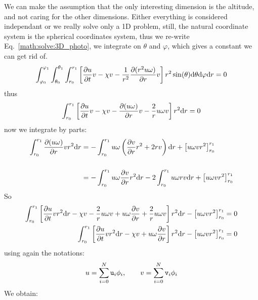 We can make the assumption that the only interesting dimension is the altitude, and
not caring for the other dimensions. Either everything
is considered independant or we really solve only a 1D problem, still,
the natural coordinate system is the spherical
coordinates system, thus we re-write Eq.~\ref{math:solve:3D_photo}, 
we integrate on $\theta$ and $\varphi$,
which gives a constant we can get rid of.
\begin{equation}
\int_{\varphi_0}^{\varphi_1}\int_{\theta_0}^{\theta_1}\int_{r_0}^{r_1}\left[   \frac{\partial u}{\partial t} v 
                       - \chi v - \frac{1}{r^2}\frac{\partial(r^2u\omega)}{\partial r} v
                \right] r^2\sin(\theta)\mathrm{d}\theta\mathrm{d}\varphi\mathrm{d} r = 0
\end{equation}
thus
\begin{equation}
\int_{r_0}^{r_1}\left[   \frac{\partial u}{\partial t} v 
                       - \chi v - \frac{\partial(u\omega)}{\partial r} v
                       - \frac{2}{r}u\omega v
                \right] r^2\mathrm{d} r = 0
\end{equation}
now we integrate by parts:
\begin{equation}
\begin{split}
\int_{r_0}^{r_1}\frac{\partial(u\omega)}{\partial r} v r^2 \mathrm{d} r 
   & = - \int_{r_0}^{r_1}u\omega \left(\frac{\partial v}{\partial r}r^2 + 2 r v\right) \mathrm{d} r + \left[u\omega v r^2\right]_{r_0}^{r_1}
        \\[\baselineskip]
   & = - \int_{r_0}^{r_1}u\omega \frac{\partial v}{\partial r} r^2  \mathrm{d} r - 2 \int_{r_0}^{r_1}u\omega  r v \mathrm{d} r  + \left[u\omega v r^2\right]_{r_0}^{r_1}
\end{split}
\end{equation}
So
\begin{equation}
\begin{split}
\int_{r_0}^{r_1} \left[   \frac{\partial u}{\partial t} v r^2 \mathrm{d} r
                        - \chi v
                        - \frac{2}{r} u\omega v
                        + u\omega\frac{\partial v}{\partial r}
                        + \frac{2}{r} u\omega v
                 \right] r^2 \mathrm{d} r 
     - \left[u\omega v r^2\right]_{r_0}^{r_1}   & = 0 \\
\int_{r_0}^{r_1} \left[   \frac{\partial u}{\partial t} v r^2 \mathrm{d} r
                        - \chi v
                        + u\omega\frac{\partial v}{\partial r}
                 \right] r^2 \mathrm{d} r 
     - \left[u\omega v r^2\right]_{r_0}^{r_1}   & = 0 
\end{split}
\end{equation}
using again the notations:
\begin{equation}
u = \sum_{i=0}^{N} \mathtt{u}_i \phi_i, \qquad v = \sum_{i=0}^{N} \mathtt{v}_i \phi_i
\end{equation}
We obtain:

